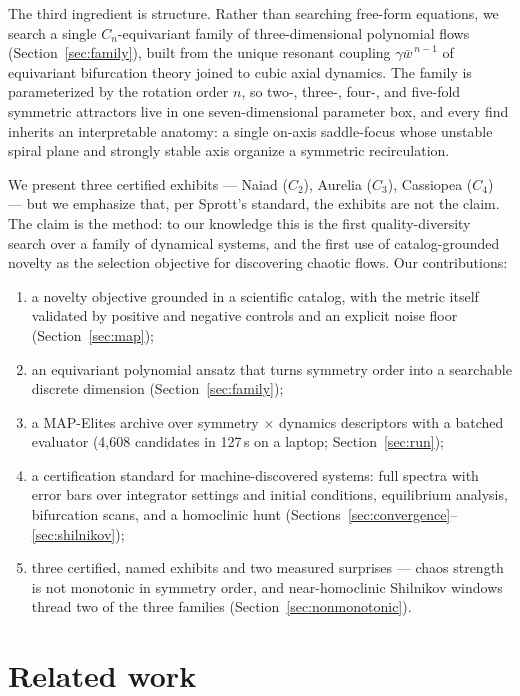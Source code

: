 \documentclass[11pt]{article}
\newcommand{\conj}[1]{\bar{#1}}
\begin{document}
The third ingredient is structure. Rather than searching free-form
equations, we search a single $C_n$-equivariant family of
three-dimensional polynomial flows (Section~\ref{sec:family}), built from
the unique resonant coupling $\gamma\conj{w}^{\,n-1}$ of equivariant
bifurcation theory \citep{golubitskyStewartSchaeffer1988} joined to cubic
axial dynamics. The family is parameterized by the rotation order $n$, so
two-, three-, four-, and five-fold symmetric attractors live in one
seven-dimensional parameter box, and every find inherits an interpretable
anatomy: a single on-axis saddle-focus whose unstable spiral plane and
strongly stable axis organize a symmetric recirculation.

We present three certified exhibits --- Naiad ($C_2$), Aurelia ($C_3$),
Cassiopea ($C_4$) --- but we emphasize that, per Sprott's standard, the
exhibits are not the claim. The claim is the method: to our knowledge this
is the first quality-diversity search over a family of dynamical systems,
and the first use of catalog-grounded novelty as the selection objective
for discovering chaotic flows. Our contributions:
\begin{enumerate}
  \item a novelty objective grounded in a scientific catalog, with the
        metric itself validated by positive and negative controls and an
        explicit noise floor (Section~\ref{sec:map});
  \item an equivariant polynomial ansatz that turns symmetry order into a
        searchable discrete dimension (Section~\ref{sec:family});
  \item a MAP-Elites archive over symmetry $\times$ dynamics descriptors
        with a batched evaluator (4{,}608 candidates in 127\,s on a
        laptop; Section~\ref{sec:run});
  \item a certification standard for machine-discovered systems: full
        spectra with error bars over integrator settings and initial
        conditions, equilibrium analysis, bifurcation scans, and a
        homoclinic hunt (Sections~\ref{sec:convergence}--\ref{sec:shilnikov});
  \item three certified, named exhibits and two measured surprises ---
        chaos strength is not monotonic in symmetry order, and
        near-homoclinic Shilnikov windows thread two of the three
        families (Section~\ref{sec:nonmonotonic}).
\end{enumerate}

\section{Related work}\label{sec:related}
\end{document}
